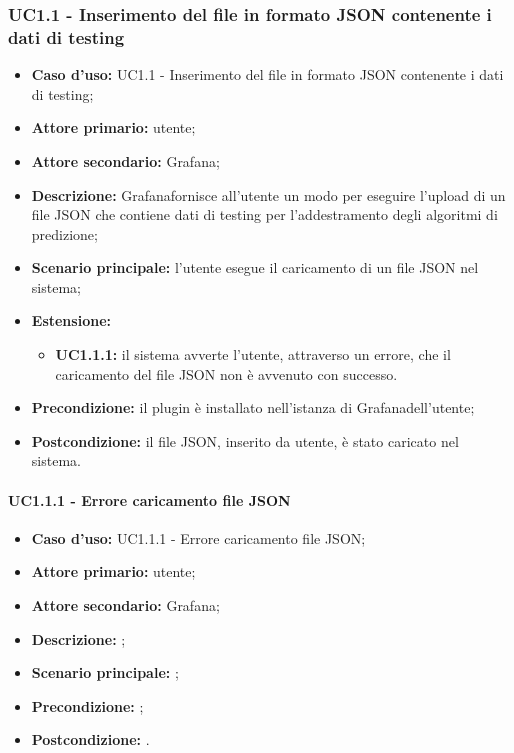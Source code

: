 \documentclass{article}
\begin{document}
	\subsubsection{UC1.1 - Inserimento del file in formato JSON contenente i dati di testing}
	\begin{itemize}
			\item \textbf{Caso d’uso:} UC1.1 - Inserimento del file in formato JSON contenente i dati di testing;
		\item \textbf{Attore primario:} utente;
		\item \textbf{Attore secondario:} Grafana\glo;
		\item \textbf{Descrizione:} Grafana\glosp fornisce all'utente un modo per eseguire l'upload di un file JSON che contiene dati di testing per l'addestramento degli algoritmi di predizione;
		\item \textbf{Scenario principale:} l'utente esegue il caricamento di un file JSON nel sistema;
		\item \textbf{Estensione:}
			\begin{itemize}
				\item \textbf{UC1.1.1:} il sistema avverte l'utente, attraverso un errore, che il caricamento del file JSON non è avvenuto con successo.
			\end{itemize}
		\item \textbf{Precondizione:} il plugin è installato nell'istanza di Grafana\glosp dell'utente;
		\item \textbf{Postcondizione:} il file JSON, inserito da utente, è stato caricato nel sistema.
	\end{itemize}

	\paragraph{UC1.1.1 - Errore caricamento file JSON}
	\begin{itemize}
		\item \textbf{Caso d’uso:} UC1.1.1 - Errore caricamento file JSON;
		\item \textbf{Attore primario:} utente;
		\item \textbf{Attore secondario:} Grafana\glo;
		\item \textbf{Descrizione:} ;
		\item \textbf{Scenario principale:} ;
		\item \textbf{Precondizione:} ;
		\item \textbf{Postcondizione:} .
	\end{itemize}
\end{document}
